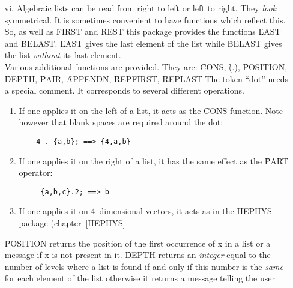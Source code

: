 \begin{itemize}
given object into a list at the wanted position.  The functions
\f{INSERT\_KEEP\_ORDER} and
\f{MERGE\_LIST} keep a given ordering when
inserting one element inside a list or when merging two lists. Both
have 3 arguments.  The last one is the name of a binary boolean
ordering function:
\begin{verbatim}
	ll:={1,2,3}$
	INSERT(x,ll,3); ==> {1,2,x,3}
	INSERT_KEEP_ORDER(5,ll,lessp); ==> {1,2,3,5}
	MERGE_LIST(ll,ll,lessp); ==> {1,1,2,2,3,3}
\end{verbatim}
\item[vi.]
Algebraic lists can be read from right to left or left to right.
They {\em look} symmetrical.  It is sometimes convenient to have
functions which reflect this.  So, as well as \f{FIRST} and \f{REST}
this package provides the functions \f{LAST} and
\f{BELAST}. \f{LAST} gives the last element of the
list while \f{BELAST} gives the list {\em without} its last element. \\
Various additional functions are provided. They are:
\f{CONS}, \f{(.)}, \f{POSITION}, \f{DEPTH}, \f{PAIR}, \f{APPENDN},
\f{REPFIRST}, \f{REPLAST}
The token ``dot'' needs a special comment. It corresponds to
several different operations.
\begin{enumerate}
\item If one applies it on the left of a list, it acts as the \f{CONS}
function.  Note however that blank spaces are required around the dot:
\begin{verbatim}
	4 . {a,b}; ==> {4,a,b}
\end{verbatim}
\item If one applies it on the right of a list, it has the same
effect as the \f{PART} operator:
\begin{verbatim}
	 {a,b,c}.2; ==> b
\end{verbatim}
\item If one applies it on 4--dimensional vectors, it acts as in the
HEPHYS package (chapter~\ref{HEPHYS}
\end{enumerate}
\f{POSITION} returns the position of the first occurrence of x in
a list or a message if x is not present in it.
\f{DEPTH} returns an {\em integer} equal to the number of levels where
a list is found if and only if this number is the {\em same} for each
element of the list otherwise it returns a message telling the user

\end{itemize}
